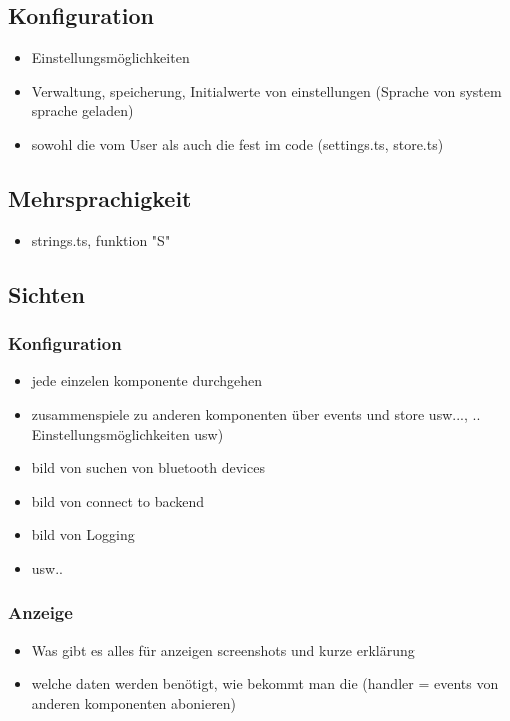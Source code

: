 \subsection{Konfiguration}
\label{sec:appKonfiguration}
\begin{itemize}
\item Einstellungsmöglichkeiten
\item Verwaltung, speicherung, Initialwerte von einstellungen (Sprache von system sprache geladen)
\item sowohl die vom User als auch die fest im code (settings.ts, store.ts)
\end{itemize}

\subsection{Mehrsprachigkeit}
\label{sec:appMehrsprachigkeit}

\begin{itemize}
\item strings.ts, funktion "S"
\end{itemize}

\subsection{Sichten}

\subsubsection{Konfiguration}
\label{sec:appSichtKonfiguration}

\begin{itemize}
\item jede einzelen komponente durchgehen
\item zusammenspiele zu anderen komponenten über events und store usw..., .. Einstellungsmöglichkeiten usw)
\item bild von suchen von bluetooth devices
\item bild von connect to backend
\item bild von Logging
\item usw..
\end{itemize}

\subsubsection{Anzeige}
\label{sec:appSichtAnzeige}

\begin{itemize}
\item Was gibt es alles für anzeigen screenshots und kurze erklärung
\item welche daten werden benötigt, wie bekommt man die (handler = events von anderen komponenten abonieren) 
\end{itemize}


